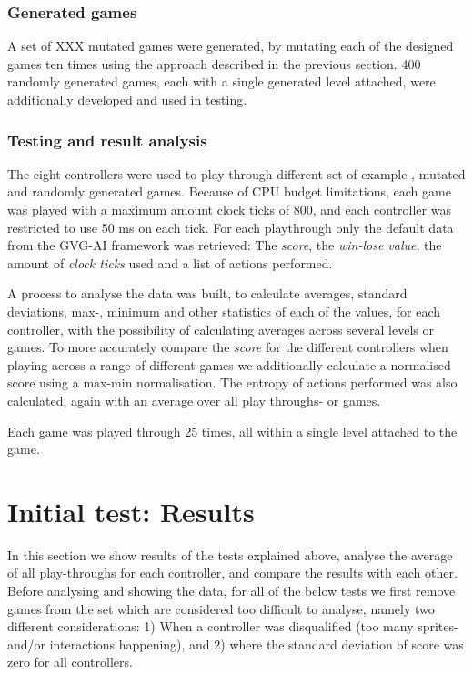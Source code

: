 \documentclass[a4paper,titlepage,final]{report}
\begin{document}
\subsubsection*{Generated games}
A set of XXX mutated games were generated, by mutating each of the designed games ten times using the approach described in the previous section.
400 randomly generated games, each with a single generated level attached, were additionally developed and used in testing.

\subsubsection*{Testing and result analysis}
The eight controllers were used to play through different set of example-, mutated and randomly generated games. Because of CPU budget limitations, each game was played with a maximum amount clock ticks of 800, and each controller was restricted to use 50 ms on each tick. 
For each playthrough only the default data from the GVG-AI framework was retrieved: The \textit{score}, the \textit{win-lose value}, the amount of \textit{clock ticks} used and a list of actions performed.



A process to analyse the data was built, to calculate averages, standard deviations, max-, minimum and other statistics of each of the values, for each controller, with the possibility of calculating averages across several levels or games.
To more accurately compare the \textit{score} for the different controllers when playing across a range of different games  we additionally calculate a normalised score using a max-min normalisation. 
The entropy of actions performed was also calculated, again with an average over all play throughs- or games.

Each game was played through 25 times, all within a single level attached to the game.


\section{Initial test: Results}
\label{sec_inittestresults}
 
In this section we show results of the tests explained above, analyse the average of all play-throughs for each controller, and compare the results with each other.
Before analysing and showing the data, for all of the below tests we first remove games from the set which are considered too difficult to analyse, namely two different considerations: 
1) When a controller was disqualified (too many sprites- and/or interactions happening), and 2) where the standard deviation of score was zero for all controllers.
\end{document}
